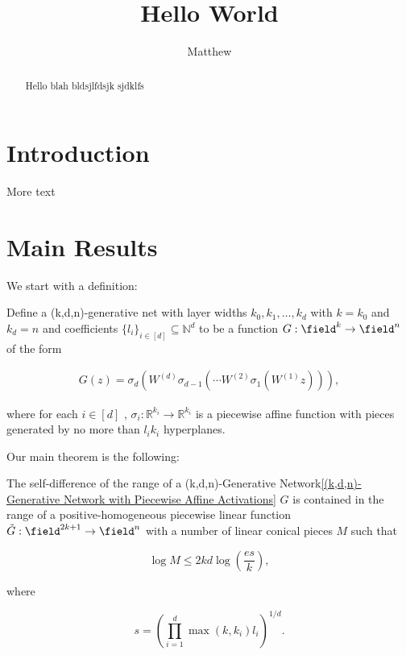\documentclass{article}
\title{Hello World}
\author{Matthew}
\begin{document}
\maketitle
\begin{abstract}
    Hello blah bldsjlfdsjk sjdklfs


\end{abstract}

\section{Introduction}\label{section:Introduction}
More text

\section{Main Results}\label{section:Main Results}
We start with a definition:

\begin{definition}
    \label{(k,d,n)-Generative Network with Piecewise Affine Activations}
    Define a (k,d,n)-generative net with layer widths  $k_{0}, k_1, \dots, k_{d}$  with  $k = k_0$  and  $k_d = n$  and coefficients  $\{ l_i \}_{i \in [d]}\subseteq \mathbb{N}^d$  to be a function  $G:\field^k \to \field^n$  of the form



    \begin{align*}
        G(z) = \sigma_d \left( W^{(d)} \sigma_{d-1}\left( \cdots W^{(2)} \sigma_1 \left( W^{(1)} z \right) \right)\right),
    \end{align*}

    where for each  $i \in [d]$ ,   $\sigma_i:\mathbb{R}^{k_i}\to\mathbb{R}^{k_i}$  is a piecewise affine function with pieces generated by no more than  $l_i k_i$  hyperplanes.


\end{definition}

Our main theorem is the following:

\begin{theorem}
    \label{Self-Difference of Affine Neural Net is Contained in Conical Piecewise Linear Function with Counted Pieces}
    The self-difference of the range of a (k,d,n)-Generative Network\ref{(k,d,n)-Generative Network with Piecewise Affine Activations}  $G$  is contained in the range of a positive-homogeneous piecewise linear function  $\tilde{G}:\field^{2k+1}\to \field^{n}$  with a number of linear conical pieces  $M$  such that


    \begin{equation*}
        \log M \leq 2kd\log\left( \frac{e s}{k} \right),
    \end{equation*}

    where


    \begin{equation*}
        s = \left( \prod_{i=1}^d \max(k, k_i)l_i \right)^{1/d}.
    \end{equation*}


\end{theorem}
\end{document}
